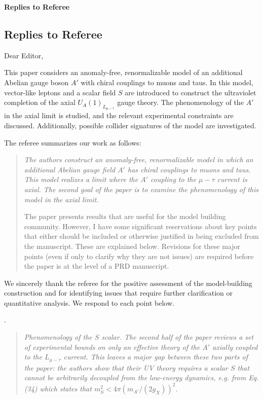 \documentclass[12pt,a4paper]{article}
\begin{document}

\noindent \textbf{Replies to Referee}
\medskip

\subsection*{Replies to Referee}

\noindent Dear Editor,

This paper considers an anomaly-free, renormalizable model of an additional Abelian
gauge boson \(A'\) with chiral couplings to muons and taus. In this model, vector-like
leptons and a scalar field \(S\) are introduced to construct the ultraviolet completion
of the axial \(U_A(1)_{L_{\mu-\tau}}\) gauge theory. The phenomenology of the \(A'\) in
the axial limit is studied, and the relevant experimental constraints are discussed.
Additionally, possible collider signatures of the model are investigated.

The referee summarizes our work as follows:

\begin{quote}
\itshape
The authors construct an anomaly-free, renormalizable model in which an additional Abelian gauge field \(A'\) has chiral couplings to muons and taus. This model realizes a limit where the \(A'\) coupling to the \(\mu-\tau\) current is axial. The second goal of the paper is to examine the phenomenology of this model in the axial limit.

The paper presents results that are useful for the model building community. However, I have some significant reservations about key points that either should be included or otherwise justified in being excluded from the manuscript. These are explained below. Revisions for these major points (even if only to clarify why they are not issues) are required before the paper is at the level of a PRD manuscript.
\end{quote}

We sincerely thank the referee for the positive assessment of the model-building construction and for identifying issues that require further clarification or quantitative analysis. We respond to each point below.

\medskip
{}. \begin{quote}\itshape
Phenomenology of the \(S\) scalar. The second half of the paper reviews a set of experimental bounds on only an effective theory of the \(A'\) axially coupled to the \(L_{\mu-\tau}\) current. This leaves a major gap between these two parts of the paper: the authors show that their UV theory requires a scalar \(S\) that cannot be arbitrarily decoupled from the low-energy dynamics, e.g. from Eq. (34) which states that \(m_S^2 < 4\pi\left(m_{A'}/(2g_X)\right)^2\).\end{quote}
\end{document}
